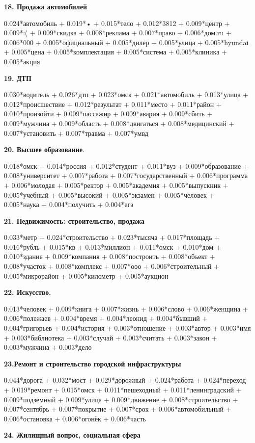 \textbf{18. Продажа автомобилей}

0.024*автомобиль + 0.019*• + 0.015*тело + 0.012*3812 + 0.009*центр + 0.009*:( + 0.009*скидка + 0.008*реклама + 0.007*право + 0.006*дом.ru + 0.006*000 + 0.005*официальный + 0.005*дилер + 0.005*улица + 0.005*hyundai + 0.005*цена + 0.005*комплектация + 0.005*система + 0.005*клиника + 0.005*акция

\textbf{19. ДТП}

0.030*водитель + 0.026*дтп + 0.023*омск + 0.021*автомобиль + 0.013*улица + 0.012*происшествие + 0.012*результат + 0.011*место + 0.011*район + 0.010*произойти + 0.009*пассажир + 0.009*авария + 0.009*сбить + 0.009*мужчина + 0.009*область + 0.008*двигаться + 0.008*медицинский + 0.007*установить + 0.007*травма + 0.007*умвд

\textbf{20. Высшее образование}.

0.018*омск + 0.014*россия + 0.012*студент + 0.011*вуз + 0.009*образование + 0.008*университет + 0.007*работа + 0.007*государственный + 0.006*программа + 0.006*молодая + 0.005*ректор + 0.005*академия + 0.005*выпускник + 0.005*учебный + 0.005*высокий + 0.005*экзамен + 0.005*человек + 0.005*наука + 0.004*получить + 0.004*егэ

\textbf{21. Недвижимость: строительство, продажа}

0.033*метр + 0.024*строительство + 0.023*тысяча + 0.017*площадь + 0.016*рубль + 0.015*кв + 0.013*миллион + 0.011*омск + 0.010*дом + 0.010*здание + 0.009*компания + 0.008*построить + 0.008*объект + 0.008*участок + 0.008*комплекс + 0.007*ооо + 0.006*строительный + 0.005*микрорайон + 0.005*километр + 0.005*аукцион

\textbf{22. Искусство.}

0.013*человек + 0.009*книга + 0.007*жизнь + 0.006*слово + 0.006*женщина + 0.006*полежаев + 0.004*время + 0.004*леонид + 0.004*бывший + 0.004*григорьев + 0.004*история + 0.003*отношение + 0.003*автор + 0.003*имя + 0.003*библиотека + 0.003*случай + 0.003*считать + 0.003*закон + 0.003*мужчина + 0.003*дело

\textbf{23.Ремонт и строительство городской инфраструктуры}

0.044*дорога + 0.032*мост + 0.029*дорожный + 0.024*работа + 0.024*переход + 0.019*ремонт + 0.015*омск + 0.011*пешеходный + 0.011*ленинградский + 0.009*подземный + 0.009*улица + 0.009*движение + 0.008*строительство + 0.007*сентябрь + 0.007*покрытие + 0.007*срок + 0.006*автомобильный + 0.006*остановка + 0.006*огонёк + 0.006*часть

\textbf{24. Жилищный вопрос, социальная сфера}


